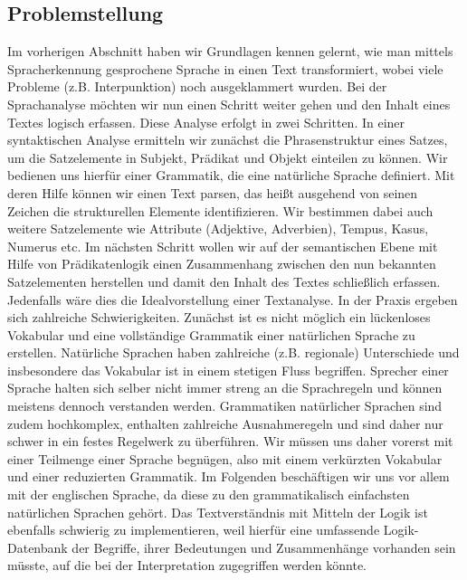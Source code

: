 \subsection{Problemstellung}
Im vorherigen Abschnitt haben wir Grundlagen kennen gelernt, wie man mittels Spracherkennung gesprochene Sprache in einen Text transformiert, wobei viele Probleme (z.B.
Interpunktion) noch ausgeklammert wurden.
Bei der Sprachanalyse möchten wir nun einen Schritt weiter gehen und den Inhalt eines Textes logisch erfassen.
Diese Analyse erfolgt in zwei Schritten.
In einer syntaktischen Analyse ermitteln wir zunächst die Phrasenstruktur eines Satzes, um die Satzelemente in Subjekt, Prädikat und Objekt einteilen zu können.
Wir bedienen uns hierfür einer Grammatik, die eine natürliche Sprache definiert.
Mit deren Hilfe können wir einen Text parsen, das heißt ausgehend von seinen Zeichen die strukturellen Elemente identifizieren.
Wir bestimmen dabei auch weitere Satzelemente wie Attribute (Adjektive, Adverbien), Tempus, Kasus, Numerus etc.
Im nächsten Schritt wollen wir auf der semantischen Ebene mit Hilfe von Prädikatenlogik einen Zusammenhang zwischen den nun bekannten Satzelementen herstellen und damit den Inhalt des Textes schließlich erfassen.
Jedenfalls wäre dies die Idealvorstellung einer Textanalyse.
In der Praxis ergeben sich zahlreiche Schwierigkeiten.
Zunächst ist es nicht möglich ein lückenloses Vokabular und eine vollständige Grammatik einer natürlichen Sprache zu erstellen.
Natürliche Sprachen haben zahlreiche (z.B.
regionale) Unterschiede und insbesondere das Vokabular ist in einem stetigen Fluss begriffen.
Sprecher einer Sprache halten sich selber nicht immer streng an die Sprachregeln und können meistens dennoch verstanden werden.
Grammatiken natürlicher Sprachen sind zudem hochkomplex, enthalten zahlreiche Ausnahmeregeln und sind daher nur schwer in ein festes Regelwerk zu überführen.
Wir müssen uns daher vorerst mit einer Teilmenge einer Sprache begnügen, also mit einem verkürzten Vokabular und einer reduzierten Grammatik.
Im Folgenden beschäftigen wir uns vor allem mit der englischen Sprache, da diese zu den grammatikalisch einfachsten natürlichen Sprachen gehört.
Das Textverständnis mit Mitteln der Logik ist ebenfalls schwierig zu implementieren, weil hierfür eine umfassende Logik-Datenbank der Begriffe, ihrer Bedeutungen und Zusammenhänge vorhanden sein müsste, auf die bei der Interpretation zugegriffen werden könnte.

